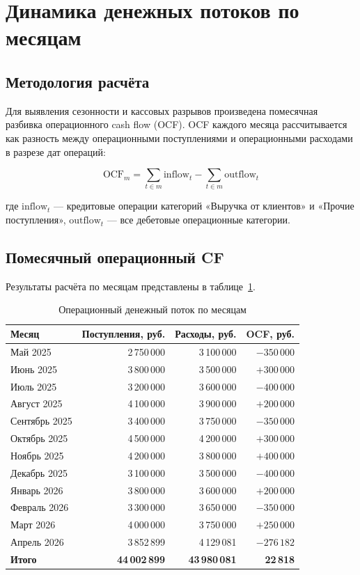 \section{Динамика денежных потоков по месяцам}

\subsection{Методология расчёта}

Для выявления сезонности и кассовых разрывов произведена помесячная разбивка операционного cash flow (OCF). OCF каждого месяца рассчитывается как разность между операционными поступлениями и операционными расходами в разрезе дат операций:

\begin{equation}
\text{OCF}_m = \sum_{t \in m} \text{inflow}_t - \sum_{t \in m} \text{outflow}_t
\end{equation}

где $\text{inflow}_t$ --- кредитовые операции категорий «Выручка от клиентов» и «Прочие поступления», $\text{outflow}_t$ --- все дебетовые операционные категории.

\subsection{Помесячный операционный CF}

Результаты расчёта по месяцам представлены в таблице~\ref{tab:monthly_ocf}.

\begin{table}[H]
\centering
\caption{Операционный денежный поток по месяцам}
\label{tab:monthly_ocf}
\begin{tabular}{lrrr}
\toprule
\textbf{Месяц} & \textbf{Поступления, руб.} & \textbf{Расходы, руб.} & \textbf{OCF, руб.} \\
\midrule
Май 2025 & 2\,750\,000 & 3\,100\,000 & $-350\,000$ \\
Июнь 2025 & 3\,800\,000 & 3\,500\,000 & $+300\,000$ \\
Июль 2025 & 3\,200\,000 & 3\,600\,000 & $-400\,000$ \\
Август 2025 & 4\,100\,000 & 3\,900\,000 & $+200\,000$ \\
Сентябрь 2025 & 3\,400\,000 & 3\,750\,000 & $-350\,000$ \\
Октябрь 2025 & 4\,500\,000 & 4\,200\,000 & $+300\,000$ \\
Ноябрь 2025 & 4\,200\,000 & 3\,800\,000 & $+400\,000$ \\
Декабрь 2025 & 3\,100\,000 & 3\,500\,000 & $-400\,000$ \\
Январь 2026 & 3\,800\,000 & 3\,600\,000 & $+200\,000$ \\
Февраль 2026 & 3\,300\,000 & 3\,650\,000 & $-350\,000$ \\
Март 2026 & 4\,000\,000 & 3\,750\,000 & $+250\,000$ \\
Апрель 2026 & 3\,852\,899 & 4\,129\,081 & $-276\,182$ \\
\midrule
\textbf{Итого} & \textbf{44\,002\,899} & \textbf{43\,980\,081} & \textbf{22\,818} \\
\bottomrule
\end{tabular}
\end{table}

